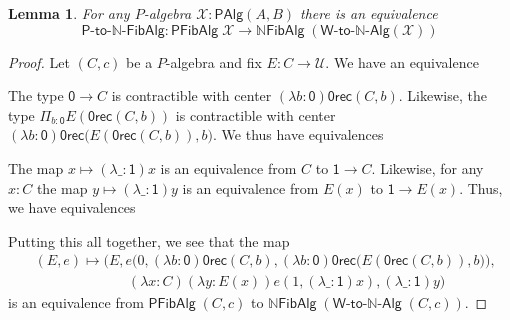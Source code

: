 \documentclass[10pt,a4paper,oneside,reqno]{amsart}
\numberwithin{equation}{section}
\theoremstyle{mythm}
\newtheorem{lemma}[theorem]{Lemma}
\theoremstyle{mydef}
\theoremstyle{myrmk}
\newcommand{\U}{\mathcal{U}}
\newcommand{\prd}[1]{\Pi_{#1}}
\newcommand{\abort}{\mathsf{0rec}}
\newcommand{\nat}{\ensuremath{\mathbb{N}}}
\newcommand{\W}{\mathsf{W}}
\newcommand{\Bool}{\mathsf{Bool}}
\newcommand{\one}{\mathsf{1}}
\newcommand{\zero}{\mathsf{0}}
\newcommand{\NatFibAlg}{\nat\mathsf{FibAlg}}
\newcommand{\WAlgToNatAlg}{\W\text{-}\mathsf{to}\text{-}\nat\text{-}\mathsf{Alg}}
\newcommand{\WFibAlgToNatFibAlg}{\mathsf{P}\text{-}\mathsf{to}\text{-}\nat\text{-}\mathsf{FibAlg}}
\newcommand{\WAlg}{\mathsf{PAlg}}
\newcommand{\WFibAlg}{\mathsf{PFibAlg}}
\newcommand{\X}{\mathcal{X}}
\begin{document}
\begin{lemma}
For any $P$-algebra $\X : \WAlg(A,B)$ there is an equivalence
\[ \WFibAlgToNatFibAlg : \WFibAlg \; \X \to \NatFibAlg \; (\WAlgToNatAlg(\X)) \]
\end{lemma}
\begin{proof}
Let $(C,c)$ be a $P$-algebra and fix $E : C \to \U$. We have an equivalence
\begin{center}
\end{center}
The type $\zero \to C$ is contractible with center $(\lambda b:\zero) \abort(C,b)$. Likewise, the type $\prd{b:\zero} E(\abort(C,b))$ is contractible with center 
$(\lambda b:\zero) \abort\big(E(\abort(C,b)),b\big)$. We thus have equivalences
\begin{center}
\end{center}
The map $x \mapsto (\lambda \_:\one)x$ is an equivalence from $C$ to $\one \to C$. Likewise, for any $x:C$ the map $y \mapsto (\lambda \_:\one)y$  is an equivalence from $E(x)$ to $\one \to E(x)$. Thus, we have equivalences
\begin{center}
\end{center}
Putting this all together, we see that the map 
\begin{align*}
& (E,e) \mapsto \Big(E,e\big(0,(\lambda b:\zero) \abort(C,b), (\lambda b:\zero) \abort\big(E(\abort(C,b)),b\big)\big),\\ & \;\;\;\;\;\;\;\;\;\;\;\;\;\;\;\;\;\;\;\;\;\;\;\; (\lambda x:C) (\lambda y:E(x)) e(1, (\lambda \_:\one)x), (\lambda \_:\one)y\Big)
\end{align*}
is an equivalence from $\WFibAlg \; (C,c)$ to $\NatFibAlg \; (\WAlgToNatAlg \; (C,c))$.
\end{proof}
\end{document}
